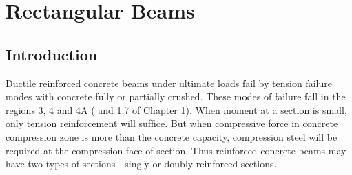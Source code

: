 \chapter{Rectangular Beams}
\section{Introduction}Ductile reinforced concrete beams under ultimate loads fail by tension failure modes with
concrete fully or partially crushed. These modes of failure fall in the regions 3, 4 and 4A
( and 1.7 of Chapter 1). When moment at a section is small, only tension reinforcement
will sufﬁce. But when compressive force in concrete compression zone is more than the concrete
capacity, compression steel will be required at the compression face of section. Thus reinforced
concrete beams may have two types of sections—singly or doubly reinforced sections.

